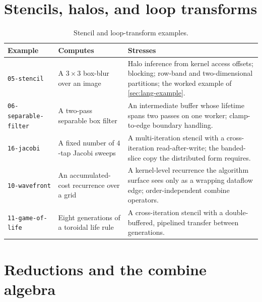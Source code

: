 \section{Stencils, halos, and loop transforms}

\begin{table}[htbp]
  \centering
  \small
  \begin{tabular}{@{}p{}p{}p{}@{}}
    \toprule
    Example & Computes & Stresses \\
    \midrule
    \texttt{05-stencil} & A $3\times3$ box-blur over an image & Halo inference from
      kernel access offsets; blocking; row-band and two-dimensional partitions; the
      worked example of \cref{sec:lang-example}. \\
    \texttt{06-separable-filter} & A two-pass separable box filter & An intermediate
      buffer whose lifetime spans two passes on one worker; clamp-to-edge boundary
      handling. \\
    \texttt{16-jacobi} & A fixed number of $4$-tap Jacobi sweeps & A
      multi-iteration stencil with a cross-iteration read-after-write; the
      banded-slice copy the distributed form requires. \\
    \texttt{10-wavefront} & An accumulated-cost recurrence over a grid & A
      kernel-level recurrence the algorithm surface sees only as a wrapping dataflow
      edge; order-independent combine operators. \\
    \texttt{11-game-of-life} & Eight generations of a toroidal life rule & A
      cross-iteration stencil with a double-buffered, pipelined transfer between
      generations. \\
    \bottomrule
  \end{tabular}
  \caption{Stencil and loop-transform examples.}
  \label{tab:examples-stencil}
\end{table}

\section{Reductions and the combine algebra}

